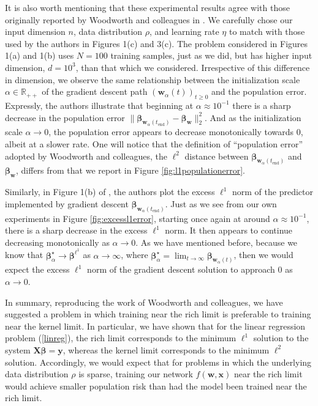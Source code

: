 \documentclass{article}
\begin{document}
It is also worth mentioning that these experimental results agree with those originally reported by Woodworth and colleagues in \cite{woodworth2020kernel}. We carefully chose our input dimension $n$, data distribution $\rho$, and learning rate $\eta$ to match with those used by the authors in Figures 1(c) and 3(c). The problem considered in Figures 1(a) and 1(b) uses $N=100$ training samples, just as we did, but has higher input dimension, $d=10^3$, than that which we considered. Irrespective of this difference in dimension, we observe the same relationship between the initialization scale $\alpha \in \mathbb{R}_{++}$ of the gradient descent path $(\boldsymbol{w}_{\alpha}(t))_{t \geq 0}$ and the population error. Expressly, the authors illustrate that beginning at $\alpha \approx 10^{-1}$ there is a sharp decrease in the population error $\| \boldsymbol{\beta}_{\boldsymbol{w}_{\alpha}(t_{\text{end}})} - \boldsymbol{\beta}_{\boldsymbol{w}} \|_2^2$. And as the initialization scale $\alpha \rightarrow 0$, the population error appears to decrease monotonically towards $0$, albeit at a slower rate. One will notice that the definition of \enquote{population error} adopted by Woodworth and colleagues, the $\ell^2$ distance between $\boldsymbol{\beta}_{\boldsymbol{w}_{\alpha}(t_{\text{end}})}$ and $\boldsymbol{\beta}_{\boldsymbol{w}}$, differs from that we report in Figure \ref{fig:l1populationerror}. 

Similarly, in Figure 1(b) of \cite{woodworth2020kernel}, the authors plot the excess $\ell^1$ norm of the predictor implemented by gradient descent $\boldsymbol{\beta}_{\boldsymbol{w}_{\alpha}(t_{\text{end}})}$. Just as we see from our own experiments in Figure \ref{fig:excessl1error}, starting once again at around $\alpha \approx 10^{-1}$, there is a sharp decrease in the excess $\ell^1$ norm. It then appears to continue decreasing monotonically as $\alpha \rightarrow 0$. As we have mentioned before, because we know that $\boldsymbol{\beta}_{\alpha}^{\star} \rightarrow \boldsymbol{\beta}^{\ell^1}$ as $\alpha \rightarrow \infty$, where $\boldsymbol{\beta}_{\alpha}^{\star} = \lim_{t \to \infty} \boldsymbol{\beta}_{\boldsymbol{w}_{\alpha}(t)}$, then we would expect the excess $\ell^1$ norm of the gradient descent solution to approach $0$ as $\alpha \rightarrow 0$.

In summary, reproducing the work of Woodworth and colleagues, we have suggested a problem in which training near the rich limit is preferable to training near the kernel limit. In particular, we have shown that for the linear regression problem (\ref{linreg}), the rich limit corresponds to the minimum $\ell^1$ solution to the system $\boldsymbol{X}\boldsymbol{\beta} = \boldsymbol{y}$, whereas the kernel limit corresponds to the minimum $\ell^2$ solution. Accordingly, we would expect that for problems in which the underlying data distribution $\rho$ is sparse, training our network $f(\boldsymbol{w}, \boldsymbol{x})$ near the rich limit would achieve smaller population risk than had the model been trained near the rich limit.
\end{document}
